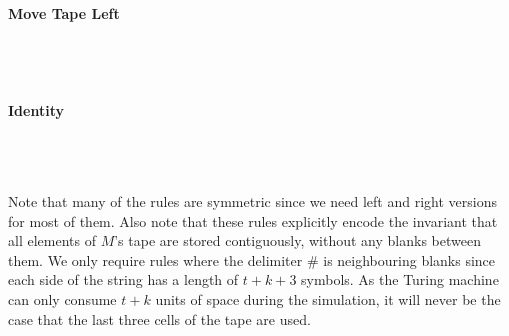 \documentclass[a4paper,UKenglish,cleveref, autoref]{lipics-v2019}
\begin{document}
\paragraph*{Move Tape Left}
\begin{center}
   \\[3ex]
   \\[3ex]
\end{center}

\paragraph*{Identity}
\begin{center}
  \rewwin{\blank & \blank & \blank}{\blank & \blank & \blank} 
  \\[3ex]
  \rewwin{\# & \blank & \blank}{\# & \blank & \blank}
   \\[3ex]
  \rewwin{\blank & \blank & \#}{\blank & \blank & \#}
\end{center}

Note that many of the rules are symmetric since we need left and right versions for most of them. 
Also note that these rules explicitly encode the invariant that all elements of $M$'s tape are stored contiguously, without any blanks \blank{} between them.
We only require rules where the delimiter \# is neighbouring blanks since each side of the string has a length of $t + k + 3$ symbols. As the Turing machine can only consume $t +k $ units of space during the simulation, it will never be the case that the last three cells of the tape are used. 
\end{document}
